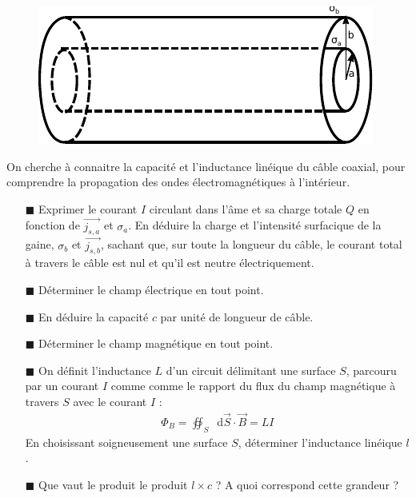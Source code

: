 \documentclass{report}
\newcommand*\dif{\mathop{}\!\mathrm{d}}
\begin{document}
\begin{figure}[h!]
\centering
		\includegraphics[scale=1]{em2.pdf}
\end{figure}

On cherche à connaitre la capacité et l'inductance linéique du câble coaxial, pour comprendre la propagation des ondes électromagnétiques à l'intérieur. 

\begin{itemize}

	\item[$\blacksquare$] Exprimer le courant $I$ circulant dans l'âme et sa charge totale $Q$ en fonction de $\vec{j_{s,a}}$ et $\sigma_a$. En déduire la charge et l'intensité surfacique de la gaine, $\sigma_b$ et $\vec{j_{s,b}}$, sachant que, sur toute la longueur du câble, le courant total à travers le câble est nul et qu'il est neutre électriquement.
	
	\item[$\blacksquare$] Déterminer le champ électrique en tout point.

	\item[$\blacksquare$] En déduire la capacité $c$ par unité de longueur de câble. 
	
	\item[$\blacksquare$]	 Déterminer le champ magnétique en tout point. 
	
	\item[$\blacksquare$] On définit l'inductance $L$ d'un circuit délimitant une surface $S$, parcouru par un courant $I$ comme  comme le rapport du flux du champ magnétique à travers $S$ avec le courant $I$ :
	\begin{align*}
		\Phi_B=\oiint_S \dif \vec{S}\cdot\vec{B}=LI
	\end{align*}
En choisissant soigneusement une surface $S$, déterminer l'inductance linéique $l$. 

	\item[$\blacksquare$] Que vaut le produit le produit $l\times c$ ? A quoi correspond cette grandeur ?
	
\end{itemize}
\end{document}
